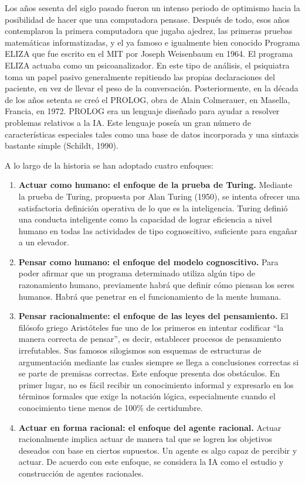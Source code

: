 Los años sesenta del siglo pasado fueron un intenso periodo de optimismo hacia la posibilidad de hacer que una computadora pensase.
Después de todo, esos años contemplaron la primera computadora que jugaba ajedrez, las
primeras pruebas matemáticas informatizadas, y el ya famoso e igualmente bien conocido
Programa ELIZA que fue escrito en el MIT por Joseph Weisenbaum en 1964. El programa ELIZA
actuaba como un psicoanalizador.
En este tipo de análisis, el psiquiatra toma un papel pasivo
generalmente repitiendo las propias declaraciones del paciente, en vez de llevar el peso
de la conversación. Posteriormente, en la década de los años setenta se creó el PROLOG,
obra de Alain Colmerauer, en Masella, Francia, en 1972. PROLOG era un lenguaje diseñado
para ayudar a resolver problemas relativos a la IA.
Este lenguaje poseía un gran número de
características especiales tales como una base de datos incorporada y una sintaxis bastante
simple (Schildt, 1990).

A lo largo de la historia se han adoptado cuatro enfoques:

\begin{enumerate}
	\item \textbf{Actuar como humano: el enfoque de la prueba de Turing.}
	Mediante la prueba de Turing, propuesta por Alan Turing (1950), se intenta ofrecer una satisfactoria
	definición operativa de lo que es la inteligencia.
	Turing definió una conducta inteligente como la capacidad de lograr eficiencia a nivel
	humano en todas las actividades de tipo cognoscitivo, suficiente para engañar a un elevador. 
	
	\item \textbf{Pensar como humano: el enfoque del modelo cognoscitivo.}
	Para poder afirmar que un programa determinado utiliza algún tipo de razonamiento humano,
	previamente habrá que definir cómo piensan los seres humanos. Habrá que penetrar en el
	funcionamiento de la mente humana.
	
	\item \textbf{Pensar racionalmente: el enfoque de las leyes del pensamiento.}
	El filósofo griego Aristóteles fue uno de los primeros en intentar codificar “la manera correcta
	de pensar”, es decir, establecer procesos de pensamiento irrefutables. Sus famosos silogismos
	son esquemas de estructuras de argumentación mediante las cuales siempre se llega a
	conclusiones correctas si se parte de premisas correctas.
	Este enfoque presenta dos obstáculos. En primer lugar, no es fácil recibir un conocimiento
	informal y expresarlo en los términos formales que exige la notación lógica, especialmente
	cuando el conocimiento tiene menos de 100\% de certidumbre.
	
	\item \textbf{Actuar en forma racional: el enfoque del agente racional.}
	Actuar racionalmente implica actuar de manera tal que se logren los objetivos deseados con
	base en ciertos supuestos. Un agente es algo capaz de percibir y actuar. De acuerdo con este
	enfoque, se considera la IA como el estudio y construcción de agentes racionales.
\end{enumerate}
\pagebreak

